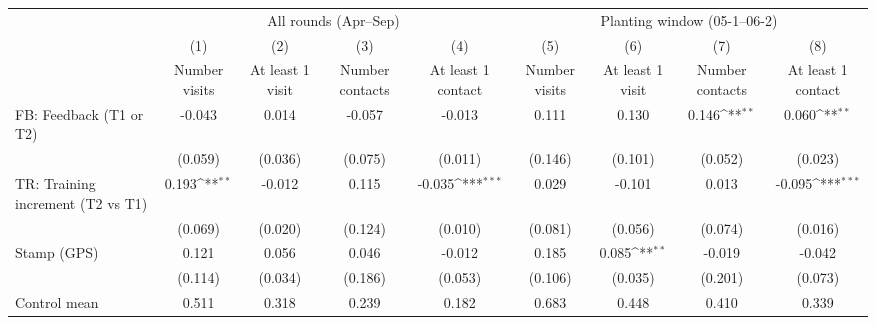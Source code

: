 {
\def\sym#1{\ifmmode^{#1}\else\(^{#1}\)\fi}
\begin{tabular}{l*{8}{c}}
\toprule
                    &\multicolumn{4}{c}{All rounds (Apr--Sep)}                                              &\multicolumn{4}{c}{Planting window (05-1--06-2)}                                       \\\cmidrule(lr){2-5}\cmidrule(lr){6-9}
                    &\multicolumn{1}{c}{(1)}&\multicolumn{1}{c}{(2)}&\multicolumn{1}{c}{(3)}&\multicolumn{1}{c}{(4)}&\multicolumn{1}{c}{(5)}&\multicolumn{1}{c}{(6)}&\multicolumn{1}{c}{(7)}&\multicolumn{1}{c}{(8)}\\
                    &\multicolumn{1}{c}{Number visits}&\multicolumn{1}{c}{At least 1 visit}&\multicolumn{1}{c}{Number contacts}&\multicolumn{1}{c}{At least 1 contact}&\multicolumn{1}{c}{Number visits}&\multicolumn{1}{c}{At least 1 visit}&\multicolumn{1}{c}{Number contacts}&\multicolumn{1}{c}{At least 1 contact}\\
\midrule
FB: Feedback (T1 or T2)&      -0.043         &       0.014         &      -0.057         &      -0.013         &       0.111         &       0.130         &       0.146\sym{**} &       0.060\sym{**} \\
                    &     (0.059)         &     (0.036)         &     (0.075)         &     (0.011)         &     (0.146)         &     (0.101)         &     (0.052)         &     (0.023)         \\
TR: Training increment (T2 vs T1)&       0.193\sym{**} &      -0.012         &       0.115         &      -0.035\sym{***}&       0.029         &      -0.101         &       0.013         &      -0.095\sym{***}\\
                    &     (0.069)         &     (0.020)         &     (0.124)         &     (0.010)         &     (0.081)         &     (0.056)         &     (0.074)         &     (0.016)         \\
Stamp (GPS)         &       0.121         &       0.056         &       0.046         &      -0.012         &       0.185         &       0.085\sym{**} &      -0.019         &      -0.042         \\
                    &     (0.114)         &     (0.034)         &     (0.186)         &     (0.053)         &     (0.106)         &     (0.035)         &     (0.201)         &     (0.073)         \\
\midrule
Control mean        &       0.511         &       0.318         &       0.239         &       0.182         &       0.683         &       0.448         &       0.410         &       0.339         \\

\end{tabular}}
